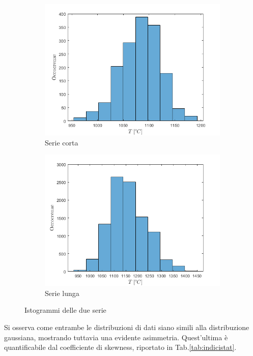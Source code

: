 \begin{figure} [H]
	
	\begin{subfigure}{0.49\textwidth}
		\centering
		\includegraphics[width=0.99\linewidth]{chapters/1-misureT/istogrammashort}
		\caption{Serie corta}
		\label{fig:istogrammashort}
	\end{subfigure}%
	\begin{subfigure}{0.49\textwidth}
		\centering
		\includegraphics[width=0.99\linewidth]{chapters/1-misureT/istogrammalong}
		\caption{Serie lunga}
		\label{fig:istogrammalong}
	\end{subfigure}
\caption{Istogrammi delle due serie}	
\label{fig:istboth}
\end{figure}
Si osserva come entrambe le distribuzioni di dati siano simili alla distribuzione gaussiana, mostrando tuttavia una evidente asimmetria. Quest'ultima è quantificabile dal coefficiente di skewness, riportato in Tab.\ref{tab:indicistat}.
